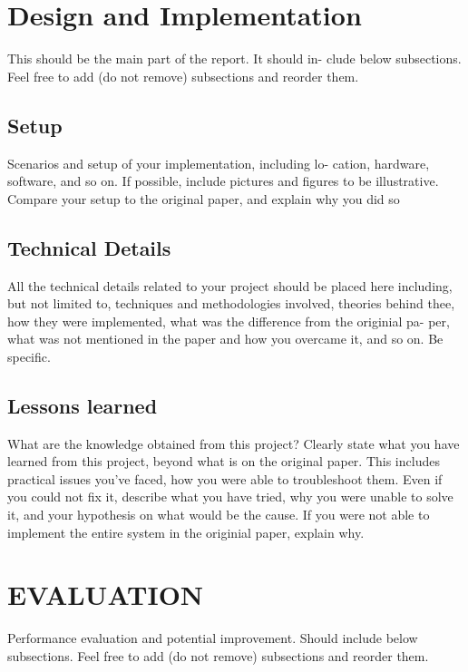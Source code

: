 \documentclass{acm_proc_article-sp}
\begin{document}
\section{Design and Implementation} \label{design_and_implementation}
This should be the main part of the report.  It should in-
clude below subsections.  Feel free to add (do not remove)
subsections and reorder them.

\subsection{Setup}
Scenarios  and  setup  of  your  implementation,  including  lo-
cation,  hardware,  software,  and so on.  If possible,  include
pictures and figures to be illustrative.  Compare your setup
to the original paper, and explain why you did so

\subsection{Technical Details}
All  the  technical  details  related  to  your  project  should  be
placed  here  including,  but  not  limited  to,  techniques  and
methodologies involved, theories behind thee, how they were
implemented, what was the difference from the originial pa-
per,  what  was  not  mentioned  in  the  paper  and  how  you
overcame it, and so on.  Be specific.

\subsection{Lessons learned}
What are the knowledge obtained from this project? Clearly
state what you have learned from this project, beyond what
is on the original paper. This includes practical issues you’ve
faced, how you were able to troubleshoot them.  Even if you
could not fix it, describe what you have tried, why you were
unable to solve it, and your hypothesis on what would be the
cause.  If you were not able to implement the entire system
in the originial paper, explain why.

\section{EVALUATION} \label{evaluation}
Performance evaluation and potential improvement.  Should
include below subsections.  Feel free to add (do not remove)
subsections and reorder them.
\end{document}
